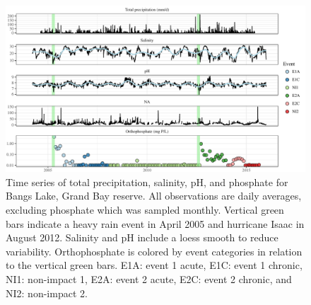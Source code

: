 \documentclass[letterpaper,12pt]{article}\usepackage[]{graphicx}\usepackage[]{color}
\begin{document}

\setcounter{figure}{1}

\begin{landscape}
\centering\vspace*{\fill}
\begin{figure}[!ht]

{\centering \includegraphics[width=1.3\textwidth]{figs/Fig2} 

}

\caption[Time series of total precipitation, salinity, pH, and phosphate for Bangs Lake, Grand Bay reserve]{Time series of total precipitation, salinity, pH, and phosphate for Bangs Lake, Grand Bay reserve.  All observations are daily averages, excluding phosphate which was sampled monthly.  Vertical green bars indicate a heavy rain event in April 2005 and hurricane Isaac in August 2012.  Salinity and pH include a loess smooth to reduce variability. Orthophosphate is colored by event categories in relation to the vertical green bars.  E1A: event 1 acute, E1C: event 1 chronic, NI1: non-impact 1, E2A: event 2 acute, E2C: event 2 chronic, and NI2: non-impact 2.}\label{fig:Fig2}
\end{figure}


\end{landscape}
\clearpage
\end{document}

